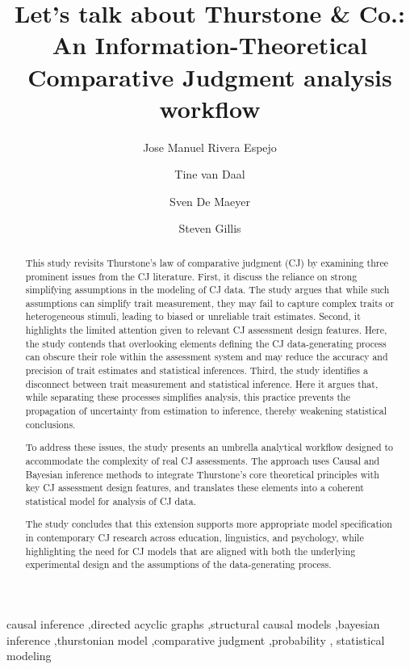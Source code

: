 \documentclass[
  authoryear,
  review,
  1p]{elsarticle}
\begin{document}
\begin{frontmatter}
\title{Let's talk about Thurstone \& Co.: An Information-Theoretical
Comparative Judgment analysis workflow}
\author[1]{Jose Manuel Rivera Espejo%
%
}
\author[1]{Tine van Daal%
%
}
\author[1]{Sven De Maeyer%
%
}
\author[2]{Steven Gillis%
%
}






        
\begin{abstract}
This study revisits Thurstone's law of comparative judgment (CJ) by
examining three prominent issues from the CJ literature. First, it
discuss the reliance on strong simplifying assumptions in the modeling
of CJ data. The study argues that while such assumptions can simplify
trait measurement, they may fail to capture complex traits or
heterogeneous stimuli, leading to biased or unreliable trait estimates.
Second, it highlights the limited attention given to relevant CJ
assessment design features. Here, the study contends that overlooking
elements defining the CJ data-generating process can obscure their role
within the assessment system and may reduce the accuracy and precision
of trait estimates and statistical inferences. Third, the study
identifies a disconnect between trait measurement and statistical
inference. Here it argues that, while separating these processes
simplifies analysis, this practice prevents the propagation of
uncertainty from estimation to inference, thereby weakening statistical
conclusions.

To address these issues, the study presents an umbrella analytical
workflow designed to accommodate the complexity of real CJ assessments.
The approach uses Causal and Bayesian inference methods to integrate
Thurstone's core theoretical principles with key CJ assessment design
features, and translates these elements into a coherent statistical
model for analysis of CJ data.

The study concludes that this extension supports more appropriate model
specification in contemporary CJ research across education, linguistics,
and psychology, while highlighting the need for CJ models that are
aligned with both the underlying experimental design and the assumptions
of the data-generating process.
\end{abstract}





\begin{keyword}
    causal inference \sep directed acyclic graphs \sep structural causal
models \sep bayesian inference \sep thurstonian model \sep comparative
judgment \sep probability \sep 
    statistical modeling
\end{keyword}
\end{frontmatter}
    
\end{document}
